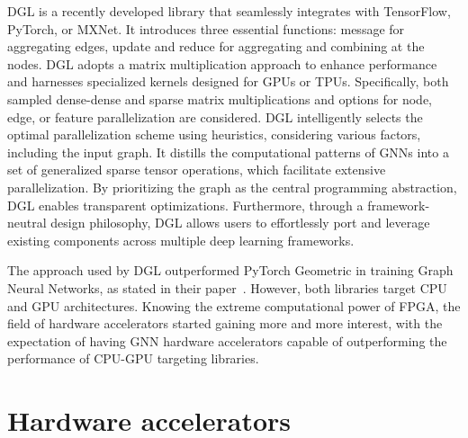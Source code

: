 DGL is a recently developed library that seamlessly integrates with TensorFlow, PyTorch, or MXNet.
It introduces three essential functions: message for aggregating edges, update and reduce for aggregating and combining at the nodes.
DGL adopts a matrix multiplication approach to enhance performance and harnesses specialized kernels designed for GPUs or TPUs.
Specifically, both sampled dense-dense and sparse matrix multiplications and options for node, edge, or feature parallelization are considered.
DGL intelligently selects the optimal parallelization scheme using heuristics, considering various factors, including the input graph.
It distills the computational patterns of GNNs into a set of generalized sparse tensor operations, which facilitate extensive parallelization.
By prioritizing the graph as the central programming abstraction, DGL enables transparent optimizations.
Furthermore, through a framework-neutral design philosophy, DGL allows users to effortlessly port and leverage existing components across multiple deep learning frameworks.

The approach used by DGL outperformed PyTorch Geometric in training Graph Neural Networks, as stated in their paper~\cite{DBLP:journals/corr/abs-1909-01315}.
However, both libraries target CPU and GPU architectures.
Knowing the extreme computational power of FPGA, the field of hardware accelerators started gaining more and more interest, with the expectation of having GNN hardware accelerators capable of outperforming the performance of CPU-GPU targeting libraries.

\section{Hardware accelerators}
\label{sec:hardware_accelerators}
